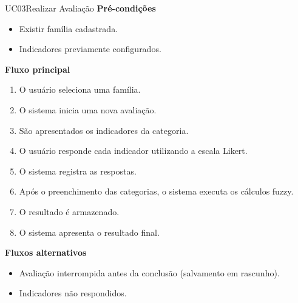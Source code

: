 \begin{usecase}{UC03}{Realizar Avaliação}
    \uclinha
    \uclinha
    \textbf{Pré-condições}
    \vspace{4pt}
    \begin{itemize}
        \item Existir família cadastrada.
        \item Indicadores previamente configurados.
    \end{itemize}
    \uclinha
    \textbf{Fluxo principal}
    \vspace{4pt}
    \begin{enumerate}
        \item O usuário seleciona uma família.
        \item O sistema inicia uma nova avaliação.
        \item São apresentados os indicadores da categoria.
        \item O usuário responde cada indicador utilizando a escala Likert.
        \item O sistema registra as respostas.
        \item Após o preenchimento das categorias, o sistema executa os cálculos fuzzy.
        \item O resultado é armazenado.
        \item O sistema apresenta o resultado final.
    \end{enumerate}
    \uclinha
    \textbf{Fluxos alternativos}
    \vspace{4pt}
    \begin{itemize}
        \item Avaliação interrompida antes da conclusão (salvamento em rascunho).
        \item Indicadores não respondidos.
    \end{itemize}
    \uclinha
\end{usecase}

\vspace{8pt}

